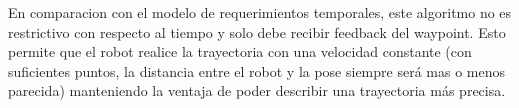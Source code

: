 En comparacion con el modelo de requerimientos temporales, este algoritmo no es restrictivo con respecto al tiempo y solo debe recibir feedback del waypoint. Esto permite que el robot realice la trayectoria con una velocidad constante (con suficientes puntos, la distancia entre el robot y la pose siempre será mas o menos parecida) manteniendo la ventaja de poder describir una trayectoria más precisa.